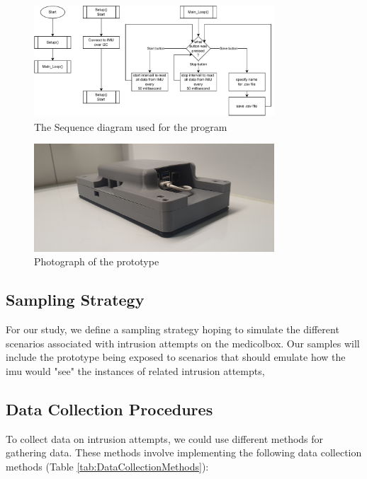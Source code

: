 \documentclass[../main.tex]{subfiles}
\begin{document}
    \begin{figure}[htbp]
        \centering
        \includegraphics[width=0.8\textwidth]
        {resources/figures/sequence.drawio.pdf}
        \caption{The Sequence diagram used for the program}
        \label{fig:sequence_diagram}
    \end{figure}
    
    \begin{figure}[htbp]
        \centering
        \includegraphics[width=0.8\textwidth]
        {resources/images/prototype_image.jpg}
        \caption{Photograph of the prototype}
        \label{fig:prototype_image}
    \end{figure}

    \subsection{Sampling Strategy}

    For our study, we define a sampling strategy hoping to simulate the different scenarios associated with
    \gls{intrusion} attempts on the \gls{medicolbox}.
    Our samples will include the prototype being exposed to scenarios that should emulate how the \gls{imu} would "see" the 
    instances of related \gls{intrusion} attempts,

    \subsection{Data Collection Procedures}

    To collect data on \gls{intrusion} attempts, we could
    use different methods for gathering data.
    These methods involve implementing the
    following data collection methods (Table \ref{tab:DataCollectionMethods}):
\end{document}
